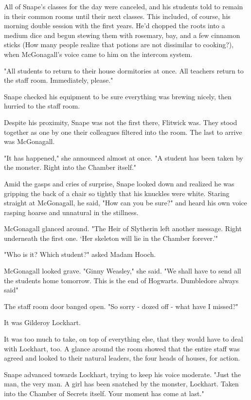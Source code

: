 All of Snape's classes for the day were canceled, and his students told to remain in their common rooms until their next classes. This included, of course, his morning double session with the first years. He'd chopped the roots into a medium dice and begun stewing them with rosemary, bay, and a few cinnamon sticks (How many people realize that potions are not dissimilar to cooking?), when McGonagall's voice came to him on the intercom system.

"All students to return to their house dormitories at once. All teachers return to the staff room. Immediately, please."

Snape checked his equipment to be sure everything was brewing nicely, then hurried to the staff room.

Despite his proximity, Snape was not the first there, Flitwick was. They stood together as one by one their colleagues filtered into the room. The last to arrive was McGonagall.

"It has happened," she announced almost at once. "A student has been taken by the monster. Right into the Chamber itself."

Amid the gasps and cries of surprise, Snape looked down and realized he was gripping the back of a chair so tightly that his knuckles were white. Staring straight at McGonagall, he said, "How can you be sure?" and heard his own voice rasping hoarse and unnatural in the stillness.

McGonagall glanced around. "The Heir of Slytherin left another message. Right underneath the first one. `Her skeleton will lie in the Chamber forever.'"

"Who is it? Which student?" asked Madam Hooch.

McGonagall looked grave. "Ginny Weasley," she said. "We shall have to send all the students home tomorrow. This is the end of Hogwarts. Dumbledore always said{\el}"

The staff room door banged open. "So sorry - dozed off - what have I missed?"

It was Gilderoy Lockhart.

It was too much to take, on top of everything else, that they would have to deal with Lockhart, too. A glance around the room showed that the entire staff was agreed and looked to their natural leaders, the four heads of houses, for action.

Snape advanced towards Lockhart, trying to keep his voice moderate. "Just the man, the very man. A girl has been snatched by the monster, Lockhart. Taken into the Chamber of Secrets itself. Your moment has come at last."

